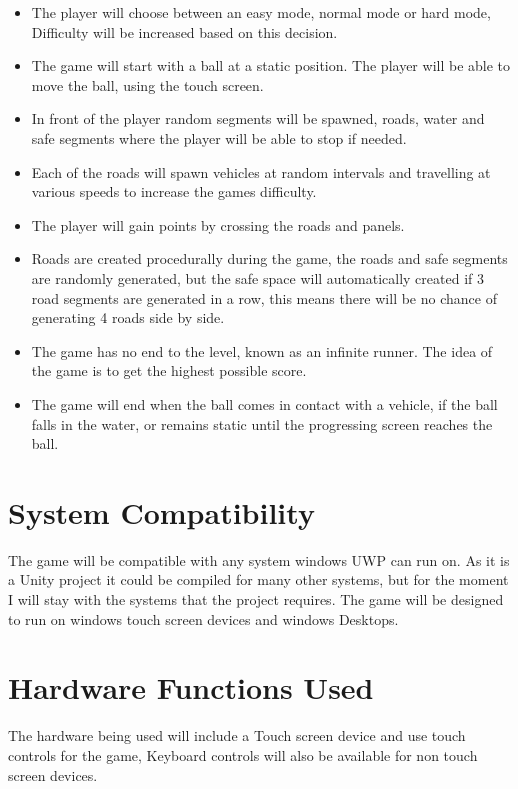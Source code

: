 \documentclass{article}
\begin{document}
\begin{itemize}
\item The player will choose between an easy mode, normal mode or hard mode, Difficulty will be increased based on this decision.
\item The game will start with a ball at a static position. The player will be able to move the ball, using the touch screen.
\item In front of the player random segments will be spawned, roads, water and safe segments where the player will be able to stop if needed.
\item Each of the roads will spawn vehicles at random intervals and travelling at various speeds to increase the games difficulty.
\item The player will gain points by crossing the roads and panels.
\item Roads are created procedurally during the game, the roads and safe segments are randomly generated, but the safe space will automatically created if 3 road segments are generated in a row, this means there will be no chance of generating 4 roads side by side.
\item The game has no end to the level, known as an infinite runner. The idea of the game is to  get the highest possible score.
\item The game will end when the ball comes in contact with a vehicle, if the ball falls in the water, or remains static until the progressing screen reaches the ball.
\end{itemize}

\section{System Compatibility}

The game will be compatible with any system windows UWP can run on. As it is a Unity project it could be compiled for many other systems, but for the moment I will stay with the systems that the project requires. The game will be designed to run on windows touch screen devices and windows Desktops.

\section{Hardware Functions Used}

The hardware being used will include a Touch screen device and use touch controls for the game, Keyboard controls will also be available for non touch screen devices.
\end{document}
